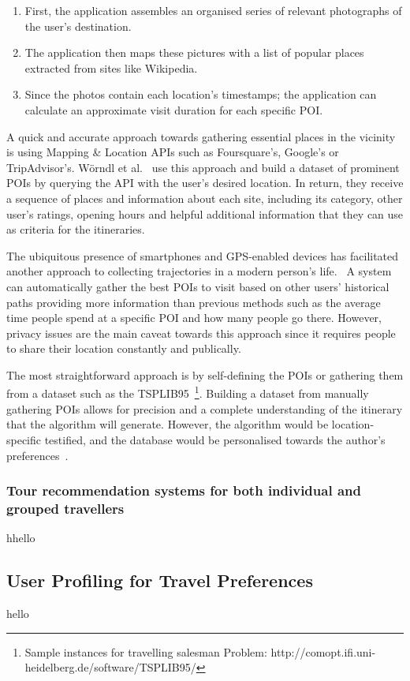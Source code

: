\begin{enumerate}

\item First, the application assembles an organised
    series of relevant photographs of the user’s
    destination.

\item The application then maps these pictures with a
    list of popular places extracted from sites like
    Wikipedia.

\item Since the photos contain each location’s
    timestamps; the application can calculate an
    approximate visit duration for each specific POI.\

\end{enumerate}

A quick and accurate approach towards gathering
essential places in the vicinity is using Mapping \&
Location APIs such as Foursquare's, Google's or TripAdvisor's. 
Wörndl et al.~\cite{Worndl2017} use this approach and build
a dataset of prominent POIs by querying the API with the
user's desired location. In return, they receive a
sequence of places and information about each site,
including its category, other user's ratings, opening
hours and helpful additional information that they can
use as criteria for the itineraries.

The ubiquitous presence of smartphones and GPS-enabled
devices has facilitated another approach to collecting
trajectories in a modern person's
life.~\cite{Chen2011, 10.1145/1889681.1889683} A
system can automatically gather the best POIs to visit based on
other users' historical paths providing more
information than previous methods such as the average
time people spend at a specific POI and how many
people go there. However, privacy issues are the main
caveat towards this approach since it requires people
to share their location constantly and publically\cite{Lim2018}. 

The most straightforward approach is by self-defining
the POIs or gathering them from a dataset such as the
TSPLIB95~\footnote{Sample instances for travelling
salesman Problem:
http://comopt.ifi.uni-heidelberg.de/software/TSPLIB95/}.
Building a
dataset from manually gathering POIs allows for
precision and a complete understanding of the
itinerary that the algorithm will generate. However,
the algorithm would be location-specific testified,
and the database would be personalised towards the
author's preferences~\cite{Chou2021a, Wisittipanich2020, Erbil}.

\subsubsection{Tour recommendation systems for both
individual and grouped travellers}

hhello

\subsection{User Profiling for Travel Preferences}
hello
